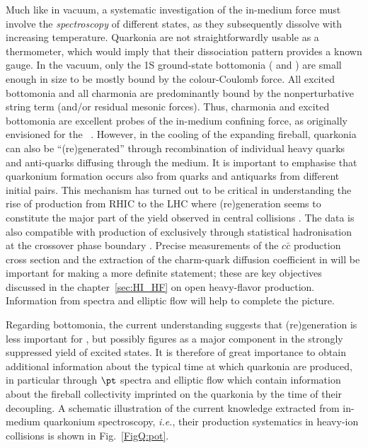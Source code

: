 \documentclass[../report.tex]{subfiles}
\begin{document}
Much like in vacuum, a systematic investigation of the in-medium force must involve the {\em spectroscopy} of different states, as they subsequently dissolve with increasing temperature. Quarkonia are not straightforwardly usable as a thermometer, which would imply that their dissociation pattern provides a known gauge. In the vacuum, only the 1S ground-state bottomonia ( and \PGhb) are small enough in size to be mostly bound by the colour-Coulomb force. All excited bottomonia and all charmonia are predominantly bound by the nonperturbative string term (and/or residual mesonic forces). 
Thus, charmonia and excited bottomonia are excellent probes of the in-medium confining force, as originally envisioned for the \PJgy~\cite{Matsui:1986dk}.
However, in the cooling of the expanding fireball, quarkonia can also be ``(re)generated'' through recombination of individual heavy quarks and anti-quarks diffusing through the medium. It is important to emphasise that quarkonium formation occurs also from quarks and antiquarks from different initial pairs.
This mechanism \cite{BraunMunzinger:2000px,Thews:2000rj,Young:2008he} has turned out to be critical in understanding the rise of \PJgy production from RHIC to the LHC where (re)generation seems to constitute the major part of the yield observed in central \PbPb collisions \cite{Rapp:2017chc}.
The data is also compatible with production of \PJgy exclusively through statistical hadronisation at the crossover phase boundary \cite{Andronic:2017pug}.
Precise measurements of the $c\bar{c}$ production cross section and the extraction of the charm-quark diffusion coefficient in \RunsThreeFour will be important for making a more definite statement; these are key objectives discussed in the chapter~\ref{sec:HI_HF} on open heavy-flavor production. Information from \pt spectra and elliptic flow will help to complete the picture.

Regarding bottomonia, the current understanding suggests that (re)generation is less important for , but possibly figures as a major component in the strongly suppressed yield of excited states. It is therefore of great importance to obtain additional information about the typical time at which quarkonia are produced, in particular through $\pt$ spectra and elliptic flow which contain information about the fireball collectivity imprinted on the quarkonia by the time of their decoupling. A schematic illustration of the current knowledge extracted from in-medium quarkonium spectroscopy, {\it i.e.}, their production systematics in heavy-ion collisions is shown in Fig.~\ref{FigQ:pot}.        
\end{document}
